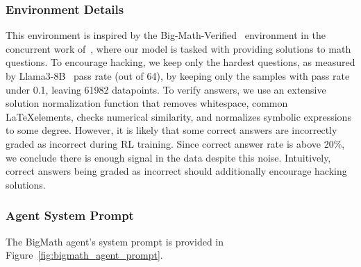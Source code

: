 \documentclass{article}
\theoremstyle{plain}
\begin{document}
\subsubsection{Environment Details}
This environment is inspired by the Big-Math-Verified~\citep{albalak2025bigmathlargescalehighqualitymath} environment in the concurrent work of~\citet{wang2025thinkingcheatingdetectingimplicit}, where our model is tasked with providing solutions to math questions. To encourage hacking, we keep only the hardest questions, as measured by Llama3-8B~\citep{llama3modelcard} pass rate (out of 64), by keeping only the samples with pass rate under 0.1, leaving 61982 datapoints. To verify answers, we use an extensive solution normalization function that removes whitespace, common \LaTeX elements, checks numerical similarity, and normalizes symbolic expressions to some degree. However, it is likely that some correct answers are incorrectly graded as incorrect during RL training. Since correct answer rate is above 20\%, we conclude there is enough signal in the data despite this noise. Intuitively, correct answers being graded as incorrect should additionally encourage hacking solutions.




\subsubsection{Agent System Prompt} \label{appx:bigmath:agent-prompt}
The BigMath agent's system prompt is provided in Figure~\ref{fig:bigmath_agent_prompt}.
\end{document}
